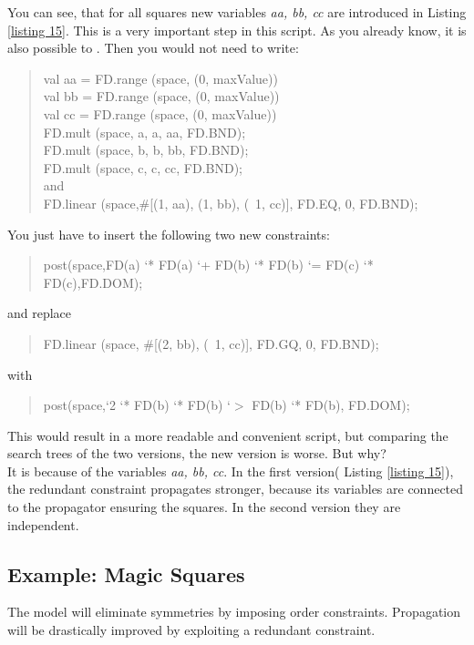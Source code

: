 \documentclass[a4paper]{scrartcl}
\begin{document}
You can see, that for all squares new variables {\it aa, bb, cc}
are introduced in Listing \ref{listing 15}. This is a very important
step in this script. As you already know, it is also possible to
. Then you would not need to write:
\begin{quote}
 val aa = FD.range (space, (0, maxValue))\\
 val bb = FD.range (space, (0, maxValue))\\
 val cc = FD.range (space, (0, maxValue))\\
 FD.mult (space, a, a, aa, FD.BND);\\
 FD.mult (space, b, b, bb, FD.BND);\\
 FD.mult (space, c, c, cc, FD.BND);\\
and\\
 FD.linear (space,$ \#$[(1, aa), (1, bb), (~1, cc)], FD.EQ, 0, FD.BND);
\end{quote}
You just have to insert the following two new constraints:
\begin{quote}
 post(space,FD(a) `* FD(a) `+ FD(b) `* FD(b) `= FD(c) `* FD(c),FD.DOM);
\end{quote}
and replace
\begin{quote}
 FD.linear (space, $\#$[(2, bb), (~1, cc)], FD.GQ, 0, FD.BND);
\end{quote}
with
\begin{quote}
post(space,`2 `* FD(b) `* FD(b) `$>$ FD(b) `* FD(b), FD.DOM);
\end{quote}
\par
This would result in a more readable and convenient script, but
comparing the search trees of the two versions, the new version
is worse. But why?\\
It is because of the variables {\it aa, bb, cc}. In the first
version( Listing \ref{listing 15}), the redundant constraint
propagates stronger, because its variables are connected to
the propagator ensuring the squares. In the second version they
are independent. 


\newpage
\subsection{Example: Magic Squares}

The model will eliminate symmetries by imposing order 
constraints. Propagation will be drastically improved by 
exploiting a redundant constraint. 
\end{document}
